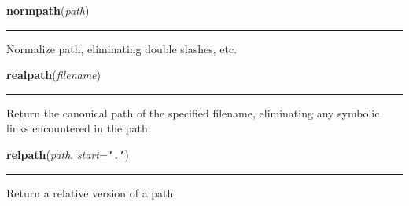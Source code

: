     \label{posixpath:normpath}

    \vspace{0.5ex}

\hspace{.8\funcindent}\begin{boxedminipage}{\funcwidth}

    \raggedright \textbf{normpath}(\textit{path})

    \vspace{-1.5ex}

    \rule{\textwidth}{0.5\fboxrule}
\setlength{\parskip}{2ex}
    Normalize path, eliminating double slashes, etc.

\setlength{\parskip}{1ex}
    \end{boxedminipage}

    \label{posixpath:realpath}

    \vspace{0.5ex}

\hspace{.8\funcindent}\begin{boxedminipage}{\funcwidth}

    \raggedright \textbf{realpath}(\textit{filename})

    \vspace{-1.5ex}

    \rule{\textwidth}{0.5\fboxrule}
\setlength{\parskip}{2ex}
    Return the canonical path of the specified filename, eliminating any 
    symbolic links encountered in the path.

\setlength{\parskip}{1ex}
    \end{boxedminipage}

    \label{posixpath:relpath}

    \vspace{0.5ex}

\hspace{.8\funcindent}\begin{boxedminipage}{\funcwidth}

    \raggedright \textbf{relpath}(\textit{path}, \textit{start}={\tt \texttt{'}\texttt{.}\texttt{'}})

    \vspace{-1.5ex}

    \rule{\textwidth}{0.5\fboxrule}
\setlength{\parskip}{2ex}
    Return a relative version of a path

\setlength{\parskip}{1ex}
    \end{boxedminipage}

